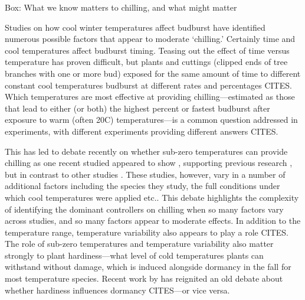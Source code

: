 \documentclass[11pt]{article}
\begin{document}
\vspace{10ex}
{\sc Box: What we know matters to chilling, and what might matter} %

Studies on how cool winter temperatures affect budburst have identified numerous possible factors that appear to moderate `chilling.' Certainly time and cool temperatures affect budburst timing. Teasing out the effect of time versus temperature has proven difficult, but plants and cuttings (clipped ends of tree branches with one or more bud) exposed for the same amount of time to different constant cool temperatures budburst at different rates and percentages CITES. Which temperatures are most effective at providing chilling---estimated as those that lead to either (or both) the highest percent or fastest budburst after exposure to warm (often 20\degree C) temperatures---is a common question addressed in experiments, with different experiments providing different answers CITES. 

This has led to debate recently on whether sub-zero temperatures can provide chilling as one recent studied appeared to show \citep{baum2021}, supporting previous research \citep{Jones:2012,Sonsteby:2014aa}, but in contrast to other studies \citep{lamb1948effect,cook2005freezing,Man:2010aa}. These studies, however, vary in a number of additional factors including the species they study, the full conditions under which cool temperatures were applied etc.. This debate highlights the complexity of identifying the dominant controllers on chilling when so many factors vary across studies, and so many factors appear to moderate effects. In addition to the temperature range, temperature variability also appears to play a role CITES. The role of sub-zero temperatures and temperature variability also matter strongly to plant hardiness---what level of cold temperatures plants can withstand without damage, which is induced alongside dormancy in the fall for most temperature species. Recent work by \citet{kovaleskipreprint} has reignited an old debate about whether hardiness influences dormancy CITES---or vice versa. 
\end{document}

